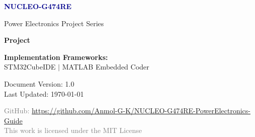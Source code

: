 

\begin{titlepage}
    \centering

    \vspace*{2cm}

    {\Huge \bfseries \textcolor{darkblue}{NUCLEO-G474RE}}

    \vspace{0.5cm}

    {\LARGE \textcolor{stmblue}{Power Electronics Project Series}}

    \vspace{2cm}

    {\fontsize{24}{28}\selectfont \bfseries Project \projectnumber}

    \vspace{1.5cm}

    {\Large \projecttitle}

    \vspace{2cm}

    {\large \projectdescription}

    \vspace{3cm}

    {\normalsize
        \textbf{Implementation Frameworks:}\\
        STM32CubeIDE \quad $\mid$ \quad MATLAB Embedded Coder
    }

    \vspace{4cm}

    {\footnotesize
        Document Version: 1.0\\
        Last Updated: \today
    }

    \vfill

    {\small
        \textcolor{gray}{
            GitHub: \url{https://github.com/Anmol-G-K/NUCLEO-G474RE-PowerElectronics-Guide}\\
            This work is licensed under the MIT License
        }
    }

\end{titlepage}

